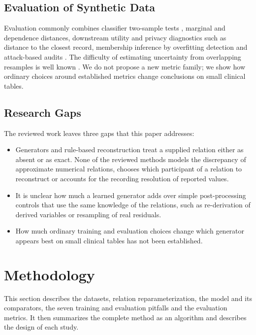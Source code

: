 \documentclass[conference]{IEEEtran}
\begin{document}
\subsection{Evaluation of Synthetic Data}

Evaluation commonly combines classifier two-sample tests \cite{lopezpaz2017c2st}, marginal and dependence distances, downstream utility and privacy diagnostics such as distance to the closest record, membership inference by overfitting detection \cite{vanbreugel2023domias} and attack-based audits \cite{giomi2023anonymeter}. The difficulty of estimating uncertainty from overlapping resamples is well known \cite{bengio2004variance}. We do not propose a new metric family; we show how ordinary choices around established metrics change conclusions on small clinical tables.

\subsection{Research Gaps}

The reviewed work leaves three gaps that this paper addresses:
\begin{itemize}
\item Generators and rule-based reconstruction treat a supplied relation either as absent or as exact. None of the reviewed methods models the discrepancy of approximate numerical relations, chooses which participant of a relation to reconstruct or accounts for the recording resolution of reported values.
\item It is unclear how much a learned generator adds over simple post-processing controls that use the same knowledge of the relations, such as re-derivation of derived variables or resampling of real residuals.
\item How much ordinary training and evaluation choices change which generator appears best on small clinical tables has not been established.
\end{itemize}

\section{Methodology}
\label{sec:method}

This section describes the datasets, relation reparameterization, the model and its comparators, the seven training and evaluation pitfalls and the evaluation metrics. It then summarizes the complete method as an algorithm and describes the design of each study.
\end{document}
